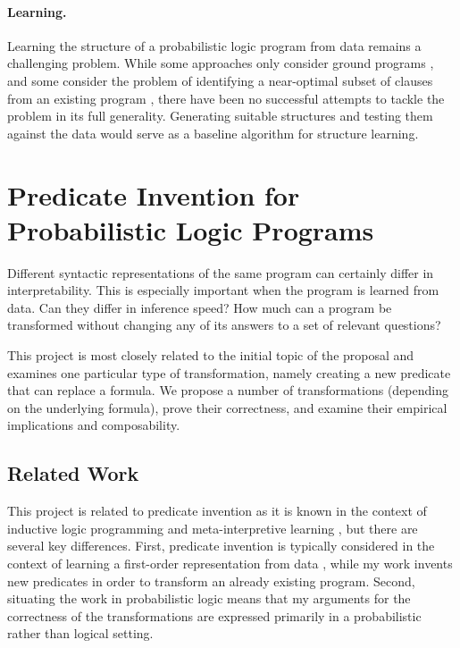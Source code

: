 \documentclass{article}
\begin{document}
\paragraph{Learning.} Learning the structure of a probabilistic logic program
from data remains a challenging problem. While some approaches only consider
ground programs \cite{riguzzi2007learning,DBLP:journals/ml/Riguzzi08}, and some
consider the problem of identifying a near-optimal subset of clauses from an
existing program \cite{DBLP:conf/ilp/RaedtKKRT06}, there have been no successful
attempts to tackle the problem in its full generality. Generating suitable
structures and testing them against the data would serve as a baseline algorithm
for structure learning.

\section{Predicate Invention for Probabilistic Logic Programs} \label{sec:3}

Different syntactic representations of the same program can certainly differ in
interpretability. This is especially important when the program is learned from
data. Can they differ in inference speed? How much can a program be transformed
without changing any of its answers to a set of relevant questions?

This project is most closely related to the initial topic of the proposal and
examines one particular type of transformation, namely creating a new predicate
that can replace a formula. We propose a number of transformations (depending on
the underlying formula), prove their correctness, and examine their empirical
implications and composability.

\subsection{Related Work}

This project is related to predicate invention as it is known in the context of
inductive logic programming and meta-interpretive learning
\cite{DBLP:conf/ruleml/Muggleton17,DBLP:journals/ml/MuggletonLT15}, but there
are several key differences. First, predicate invention is typically considered
in the context of learning a first-order representation from data
\cite{kramer1995predicate,DBLP:journals/jetai/Muggleton94}, while my work
invents new predicates in order to transform an already existing program.
Second, situating the work in probabilistic logic means that my arguments for
the correctness of the transformations are expressed primarily in a
probabilistic rather than logical setting.
\end{document}
